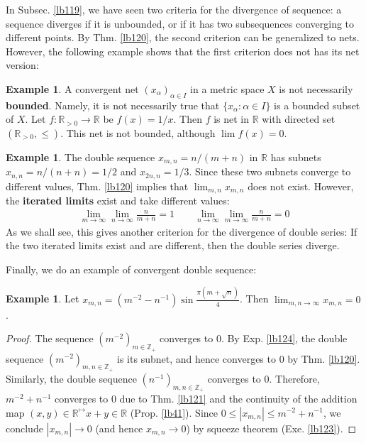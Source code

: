 \documentclass[12pt,b5paper,notitlepage]{article}
\theoremstyle{definition}
\newtheorem{eg}[df]{Example}
\theoremstyle{plain}
\newcommand{\Zbb}{\mathbb Z}
\newcommand{\Rbb}{\mathbb R}
\newcommand{\dps}{\displaystyle}
\numberwithin{equation}{section}
\begin{document}
In Subsec. \ref{lb119}, we have seen two criteria for the divergence of sequence: a sequence diverges if it is unbounded, or if it has two subsequences converging to different points. By Thm. \ref{lb120}, the second criterion can be generalized to nets. However, the following example shows that the first criterion does not has its net version:





\begin{eg}
A convergent net $(x_\alpha)_{\alpha\in I}$ in a metric space $X$ is not necessarily \textbf{bounded}. Namely, it is not necessarily true that $\{x_\alpha:\alpha\in I\}$ is a bounded subset of $X$. Let $f:\Rbb_{>0}\rightarrow\Rbb$ be $f(x)=1/x$. Then $f$ is net in $\Rbb$ with directed set $(\Rbb_{> 0},\leq)$. This net is not bounded, although $\lim f(x)=0$.
\end{eg}





\begin{eg}
The double sequence $x_{m,n}=n/(m+n)$ in $\Rbb$ has subnets $x_{n,n}=n/(n+n)=1/2$ and $x_{2n,n}=1/3$. Since these two subnets converge to different values, Thm. \ref{lb120} implies that $\lim_{m,n}x_{m,n}$ does not exist. However, the \textbf{iterated limits} exist and take different values:
\begin{gather*}
\lim_{m\rightarrow\infty}\lim_{n\rightarrow\infty}\frac{n}{m+n}=1\qquad \lim_{n\rightarrow\infty}\lim_{m\rightarrow\infty}\frac{n}{m+n}=0
\end{gather*}
As we shall see, this gives another criterion for the divergence of double series: If the two iterated limits exist and are different, then the double series diverge.
\end{eg}


Finally, we do an example of convergent double sequence:

\begin{eg}\label{lb125}
Let $\dps x_{m,n}=(m^{-2}-n^{-1})\sin\frac{\pi(m+\sqrt n)}{4}$. Then $\dps\lim_{m,n\rightarrow\infty}x_{m,n}=0$.
\end{eg}

\begin{proof}
The sequence $(m^{-2})_{m\in\Zbb_+}$ converges to $0$. By Exp. \ref{lb124}, the double sequence $(m^{-2})_{m,n\in\Zbb_+}$ is its subnet, and hence converges to $0$ by Thm. \ref{lb120}. Similarly, the double sequence $(n^{-1})_{m,n\in\Zbb_+}$ converges to $0$. Therefore, $m^{-2}+n^{-1}$ converges to $0$ due to Thm. \ref{lb121} and the continuity of the addition map $(x,y)\in\Rbb^\mapsto x+y\in\Rbb$ (Prop. \ref{lb41}). Since $0\leq |x_{m,n}|\leq m^{-2}+n^{-1}$, we conclude $|x_{m,n}|\rightarrow 0$ (and hence $x_{m,n}\rightarrow0$) by squeeze theorem (Exe. \ref{lb123}).
\end{proof}
\end{document}
